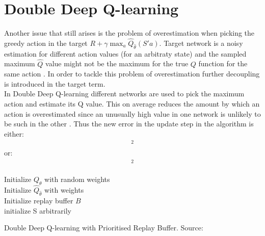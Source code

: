 
\section{Double Deep Q-learning}
Another issue that still arises is the problem of overestimation when picking the greedy action in the target $R + \gamma \max_a \hat{Q}_{\hat{\theta}}(S' a)$. Target network is a noisy estimation for different action values (for an arbitraty state) and the sampled maximum $\hat{Q}$ value might not be the maximum for the true $Q$ function for the same action \cite{lecture_dqn}. In order to tackle this problem of overestimation 
further decoupling is introduced in the target term.\\

In Double Deep Q-learning different networks are used to pick the maximum action and estimate its Q value. This on average reduces the amount by which an action is overestimated since an unusually high value in one network is unlikely to be such in the other \cite{lecture_dqn}. Thus the new error in the update step in the algorithm is either:
\begin{align}
    [R + \gamma Q_{\theta}(S', \text{arg}\max_a\ \hat{Q}_{\hat{\theta}}(S', a)) - Q_{\theta}(S, A)]^2
\end{align}
or:
\begin{align}
    [R + \gamma \hat{Q}_{\hat{\theta}}(S', \text{arg}\max_a\ Q_{\theta}(S', a)) - Q_{\theta}(S, A)]^2
\end{align}

\begin{algorithm}[H]
\SetAlgoLined
Initialize $Q_{\theta}$ with random weights \theta \; \\
Initialize $\hat{Q}_{\hat{\theta}}$ with weights \theta \; \\
Initialize replay buffer $B$\; \\
initialize S arbitrarily\;\\
\caption{Double Deep Q-learning with Prioritised Replay Buffer. Source: \cite{lecture_dqn} }
\end{algorithm}\\



